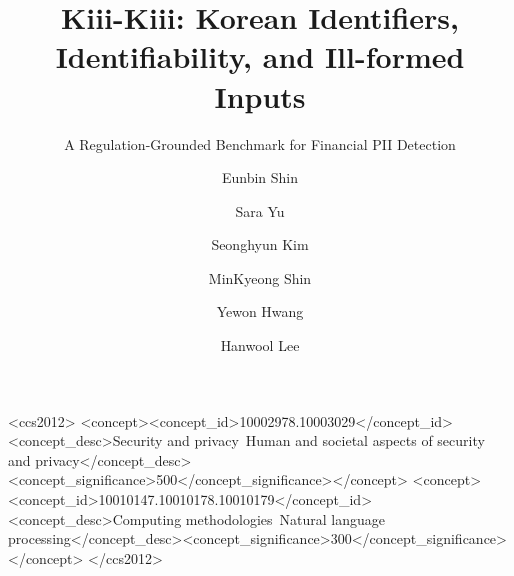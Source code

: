 \documentclass[sigconf,nonacm]{acmart}
\begin{document}
\newcommand{\kiii}{Kiii\textsuperscript{2}}
\title[Kiii-Kiii: Korean Financial PII Detection]{Kiii-Kiii: Korean Identifiers, Identifiability, and Ill-formed Inputs}
\subtitle{A Regulation-Grounded Benchmark for Financial PII Detection}

\makeatletter
\renewcommand\@ACM@checkaffil{}
\makeatother
\author{Eunbin Shin}
\author{Sara Yu}
\authornotemark[1]
\author{Seonghyun Kim}
\author{MinKyeong Shin}
\author{Yewon Hwang}
\author{Hanwool Lee}
\renewcommand{\shortauthors}{Shin, Yu, et al.}

\begin{abstract}

\end{abstract}

\begin{CCSXML}
<ccs2012>
<concept><concept_id>10002978.10003029</concept_id><concept_desc>Security and privacy~Human and societal aspects of security and privacy</concept_desc><concept_significance>500</concept_significance></concept>
<concept><concept_id>10010147.10010178.10010179</concept_id><concept_desc>Computing methodologies~Natural language processing</concept_desc><concept_significance>300</concept_significance></concept>
</ccs2012>
\end{CCSXML}
\end{document}
